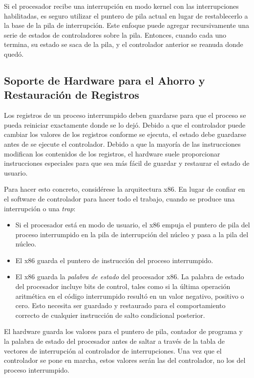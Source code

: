 \documentclass[10pt]{book}
\begin{document}
Si el procesador recibe una interrupción en modo kernel con las interrupciones habilitadas, es seguro utilizar el puntero de pila actual en lugar de restablecerlo a la base de la pila de interrupción. Este enfoque puede agregar recursivamente una serie de estados de controladores sobre la pila. Entonces, cuando cada uno termina, su estado se saca de la pila, y el controlador anterior se reanuda donde quedó.

\subsection{Soporte de Hardware para el Ahorro y Restauración de Registros}
Los registros de un proceso interrumpido deben guardarse para que el proceso se pueda reiniciar exactamente donde se lo dejó. Debido a que el controlador puede cambiar los valores de los registros conforme se ejecuta, el estado debe guardarse antes de se ejecute el controlador. Debido a que la mayoría de las instrucciones modifican los contenidos de los registros, el hardware suele proporcionar instrucciones especiales para que sea más fácil de guardar y restaurar el estado de usuario.

Para hacer esto concreto, considérese la arquitectura {\mf x86}. En lugar de confiar en el software de controlador para hacer todo el trabajo, cuando se produce una interrupción o una \textit{trap}:
\begin{itemize}
\item Si el procesador está en modo de usuario, el {\mf x86} empuja el puntero de pila del proceso interrumpido en la pila de interrupción del núcleo y pasa a la pila del núcleo.

\item El {\mf x86} guarda el puntero de instrucción del proceso interrumpido.

\item El {\mf x86} guarda la \textit{palabra de estado} del procesador {\mf x86}. La palabra de estado del procesador incluye bits de control, tales como si la última operación aritmética en el código interrumpido resultó en un valor negativo, positivo o cero. Esto necesita ser guardado y restaurado para el comportamiento correcto de cualquier instrucción de salto condicional posterior.
\end{itemize}

El hardware guarda los valores para el puntero de pila, contador de programa y la palabra de estado del procesador antes de saltar a través de la tabla de vectores de interrupción al controlador de interrupciones. Una vez que el controlador se pone en marcha, estos valores serán las del controlador, no los del proceso interrumpido.
\end{document}
